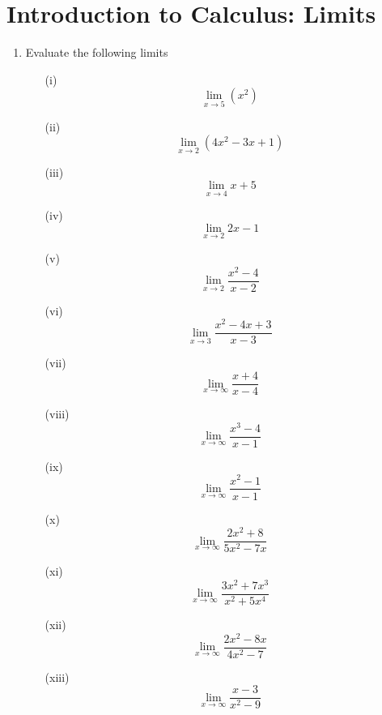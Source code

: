 \documentclass[a4paper,12pt]{article}
\begin{document}
\section*{Introduction to Calculus: Limits}

\begin{enumerate}
\item Evaluate the following limits

\begin{multicols}{2}
	\begin{itemize}
		\item[(i)] \[ \lim_{x\to 5} (x^2)\]
		
		\item[(ii)] \[ \lim_{x\to 2} (4x^2 - 3x+1)\]
		
		
		\item[(iii)]\[\lim_{x \to 4 } x  + 5 \]
		\item[(iv)]\[\lim_{x \to 2 } 2x  - 1 \]
		\item[(v)]\[\lim_{x \to 2 } \frac{x^2-4}{x-2}\]
		\item[(vi)]\[\lim_{x \to 3 } \frac{x^2-4x +3}{x-3}\]
		
		\item[(vii)]\[\lim_{x \to \infty } \frac{x+4}{x-4}\]
		\item[(viii)]\[\lim_{x \to \infty } \frac{x^3-4}{x-1}\]
		\item[(ix)] \[\lim_{x \to \infty } \frac{x^2-1}{x-1} \]
		
		\item[(x)] \[ \lim_{x \to \infty} \frac{2x^2 +8}{5x^2 - 7x} \] 
		
		\item[(xi)]\[ \lim_{x \to \infty} \frac{3x^2 +7x^3}{x^2 +5x^4} \] 
		
		\item[(xii)] \[ \lim_{x \to \infty} \frac{2x^2 - 8x }{4x^2 - 7} \]
		
		
		\item[(xiii)] \[ \lim_{x \to \infty} \frac{x-3}{x^2 - 9} \]
	\end{itemize}
\end{multicols}


\end{enumerate}
\end{document}
